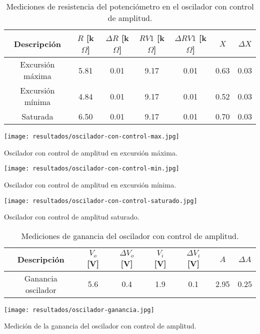 \begin{table}[ht]
\centering
\begin{tabular}{|c|c|c|c|c|c|c|}
\hline
Descripción & \(R\) [k\(\Omega\)] & \(\Delta R\) [k\(\Omega\)] & \(RV1\) [k\(\Omega\)] & \(\Delta RV1\) [k\(\Omega\)] & \(X\) & \(\Delta X\) \\ \hline
Excursión máxima & 5.81 & 0.01 & 9.17 & 0.01 & 0.63 & 0.03 \\ \hline
Excursión mínima & 4.84 & 0.01 & 9.17 & 0.01 & 0.52 & 0.03 \\ \hline
Saturada & 6.50 & 0.01 & 9.17 & 0.01 & 0.70 & 0.03 \\ \hline
\end{tabular}
\caption{Mediciones de resistencia del potenciómetro en el oscilador con control de amplitud.}
\label{tab:mediciones-resistencia-oscilador-con-control}
\end{table}

\begin{ilustracion}[ht]
    \centering
    \texttt{[image: resultados/oscilador-con-control-max.jpg]}
    \caption{Oscilador con control de amplitud en excursión máxima.}
    \label{fig:oscilador-con-control-excursion-maxima}
\end{ilustracion}

\begin{ilustracion}[ht]
    \centering
    \texttt{[image: resultados/oscilador-con-control-min.jpg]}
    \caption{Oscilador con control de amplitud en excursión mínima.}
    \label{fig:oscilador-con-control-excursion-minima}
\end{ilustracion}

\begin{ilustracion}[ht]
    \centering
    \texttt{[image: resultados/oscilador-con-control-saturado.jpg]}
    \caption{Oscilador con control de amplitud saturado.}
    \label{fig:oscilador-con-control-saturado}
\end{ilustracion}

\begin{table}[ht]
\centering
\begin{tabular}{|c|c|c|c|c|c|c|}
\hline
Descripción & \(V_o\) [V] & \(\Delta V_o\) [V] & \(V_i\) [V] & \(\Delta V_i\) [V] & \(A\) & \(\Delta A\) \\ \hline
Ganancia oscilador & 5.6 & 0.4 & 1.9 & 0.1 & 2.95 & 0.25 \\ \hline
\end{tabular}
\caption{Mediciones de ganancia del oscilador con control de amplitud.}
\label{tab:mediciones-ganancia-oscilador}
\end{table}

\begin{ilustracion}[ht]
    \centering
    \texttt{[image: resultados/oscilador-ganancia.jpg]}
    \caption{Medición de la ganancia del oscilador con control de amplitud.}
    \label{fig:oscilador-con-control-ganancia}
\end{ilustracion}
